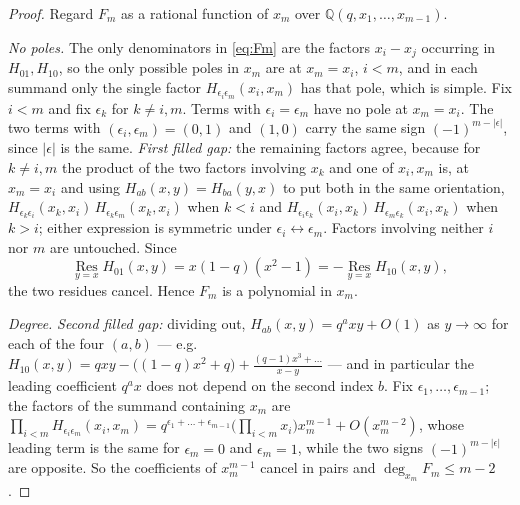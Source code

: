 \documentclass[11pt]{article}
\theoremstyle{plain}
\theoremstyle{definition}
\theoremstyle{remark}
\begin{document}
\begin{proof}
Regard $F_m$ as a rational function of $x_m$ over $\mathbb Q(q,x_1,\dots,x_{m-1})$.

\emph{No poles.} The only denominators in \eqref{eq:Fm} are the factors $x_i-x_j$
occurring in $H_{01},H_{10}$, so the only possible poles in $x_m$ are at $x_m=x_i$,
$i<m$, and in each summand only the single factor $H_{\epsilon_i\epsilon_m}(x_i,x_m)$
has that pole, which is simple. Fix $i<m$ and fix $\epsilon_k$ for
$k\ne i,m$. Terms with $\epsilon_i=\epsilon_m$ have no pole at $x_m=x_i$. The two
terms with $(\epsilon_i,\epsilon_m)=(0,1)$ and $(1,0)$ carry the same sign
$(-1)^{m-|\epsilon|}$, since $|\epsilon|$ is the same. \emph{First filled gap:} the
remaining factors agree, because for $k\ne i,m$ the product of the two factors
involving $x_k$ and one of $x_i,x_m$ is, at $x_m=x_i$ and using
$H_{ab}(x,y)=H_{ba}(y,x)$ to put both in the same orientation,
$H_{\epsilon_k\epsilon_i}(x_k,x_i)\,H_{\epsilon_k\epsilon_m}(x_k,x_i)$ when $k<i$
and $H_{\epsilon_i\epsilon_k}(x_i,x_k)\,H_{\epsilon_m\epsilon_k}(x_i,x_k)$ when
$k>i$; either expression is symmetric under $\epsilon_i\leftrightarrow\epsilon_m$.
Factors involving neither $i$ nor $m$ are untouched. Since
\[
\operatorname*{Res}_{y=x}H_{01}(x,y)=x(1-q)(x^2-1)
=-\operatorname*{Res}_{y=x}H_{10}(x,y),
\]
the two residues cancel. Hence $F_m$ is a polynomial in $x_m$.

\emph{Degree.} \emph{Second filled gap:} dividing out, $H_{ab}(x,y)=q^axy+O(1)$ as
$y\to\infty$ for each of the four $(a,b)$ --- e.g.
$H_{10}(x,y)=qxy-\bigl((1-q)x^2+q\bigr)+\frac{(q-1)x^3 + \ldots}{x-y}$ --- and in
particular the leading coefficient $q^ax$ does not depend on the second index $b$.
Fix $\epsilon_1,\dots,\epsilon_{m-1}$; the factors of the summand containing $x_m$
are $\prod_{i<m}H_{\epsilon_i\epsilon_m}(x_i,x_m)
=q^{\epsilon_1+\dots+\epsilon_{m-1}}\bigl(\prod_{i<m}x_i\bigr)x_m^{m-1}+O(x_m^{m-2})$,
whose leading term is the same for $\epsilon_m=0$ and $\epsilon_m=1$, while the two
signs $(-1)^{m-|\epsilon|}$ are opposite. So the coefficients of $x_m^{m-1}$
cancel in pairs and $\deg_{x_m}F_m\le m-2$.


\end{proof}
\end{document}
